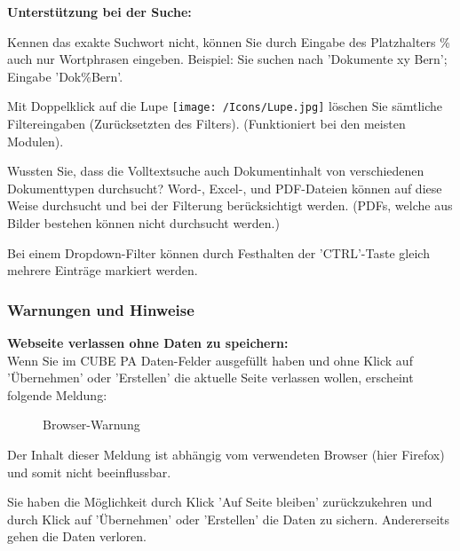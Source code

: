 \textbf{Unterstützung bei der Suche:}
\begin{compactitem}
	\item Kennen das exakte Suchwort nicht, können Sie durch Eingabe des Platzhalters \% auch nur Wortphrasen eingeben. Beispiel: Sie suchen nach 'Dokumente xy Bern'; Eingabe 'Dok\%Bern'.
	\item Mit Doppelklick auf die Lupe \texttt{[image: /Icons/Lupe.jpg]} löschen Sie sämtliche Filtereingaben (Zurücksetzten des Filters). (Funktioniert bei den meisten Modulen).
	\item Wussten Sie, dass die Volltextsuche auch Dokumentinhalt von verschiedenen Dokumenttypen durchsucht? Word-, Excel-, und PDF-Dateien können auf diese Weise durchsucht und bei der Filterung berücksichtigt werden. (PDFs, welche aus Bilder bestehen können nicht durchsucht werden.)
	\item Bei einem Dropdown-Filter können durch Festhalten der 'CTRL'-Taste gleich mehrere Einträge markiert werden.
\end{compactitem}	

\subsubsection{Warnungen und Hinweise}

\textbf{Webseite verlassen ohne Daten zu speichern:} \\
Wenn Sie im CUBE PA Daten-Felder ausgefüllt haben und ohne Klick auf 'Übernehmen' oder 'Erstellen' die aktuelle Seite verlassen wollen, erscheint folgende Meldung: 

\begin{figure}[H]
\caption{Browser-Warnung}
\end{figure}
\begin{small}
Der Inhalt dieser Meldung ist abhängig vom verwendeten Browser (hier Firefox) und somit nicht beeinflussbar.
\end{small}

\vspace{\baselineskip}

Sie haben die Möglichkeit durch Klick 'Auf Seite bleiben' zurückzukehren und durch Klick auf 'Übernehmen' oder 'Erstellen' die Daten zu sichern. Andererseits gehen die Daten verloren.

